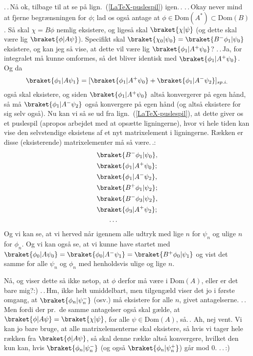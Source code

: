 \documentclass{report}
\begin{document}
.\,.\,Nå ok, tilbage til at se på lign.\ (\ref{LaTeX-puslespil}) igen.\,. .\,.\,Okay never mind at fjerne begrænsningen for $\phi$; lad os også antage at $\phi\in\mathrm{Dom}(A^*)\subset \mathrm{Dom}(B)$. Så skal $\chi = B \phi$ nemlig eksistere, og ligeså skal $\braket{\chi|\psi}$ (og dette skal være lig $\braket{\phi|A \psi}$). Specifikt skal $\braket{\chi_0|\psi_0} = \braket{B^-\phi_1|\psi_0}$ eksistere, og kan jeg så vise, at dette vil være lig $\braket{\phi_1| A^+ \psi_0}$? .\,.\,Ja, for integralet må kunne omformes, så det bliver identisk med $\braket{\phi_1| A^+ \psi_0}$. Og da 
\begin{align}
\begin{aligned}
	\braket{\phi_1|A \psi_1} = 
		[
			\braket{\phi_1 | A^+ \psi_0} +
			\braket{\phi_1 | A^- \psi_2}
		]_{sp.i.}
\end{aligned}
\end{align}
også skal eksistere, og siden $\braket{\phi_1 | A^+ \psi_0}$ altså konvergerer på egen hånd, så må $\braket{\phi_1 | A^- \psi_2}$ også konvergere på egen hånd (og altså eksistere for sig selv også). 
Nu kan vi så se ud fra lign.\ (\ref{LaTeX-puslespil}), at dette giver os et puslespil (apropos arbejdet med at opsætte ligningerne), hvor vi hele tiden kan vise den selvstendige eksistens af et nyt matrixelement i ligningerne. Rækken er disse (eksisterende) matrixelementer må så være.\,.:
\begin{align}
\begin{aligned}
	&\braket{B^- \phi_1 | \psi_0}, \\
	&\braket{\phi_1 | A^+ \psi_0}; \\
	&\braket{\phi_1 | A^- \psi_2}, \\
	&\braket{B^+ \phi_1 | \psi_2}; \\
	&\braket{B^- \phi_3 | \psi_2}, \\
	&\braket{\phi_3 | A^+ \psi_2}; \\
	&\quad\:\:\:\ldots
\end{aligned}
\end{align}
Og vi kan se, at vi herved når igennem alle udtryk med lige $n$ for $\psi_n$ og ulige $n$ for $\phi_n$. Og vi kan også se, at vi kunne have startet med $\braket{\phi_0 | A \psi_0} = \braket{\phi_0 | A^- \psi_1} = \braket{B^+ \phi_0 | \psi_1}$ og vist det samme for alle $\psi_n$ og $\phi_n$ med henholdsvis ulige og lige $n$.

Nå, og viser dette så ikke netop, at $\phi$ derfor må være i Dom$(A)$, eller er det bare mig?:) .\,.\,Hm, ikke helt umiddelbart, men tilgengæld viser det jo i første omgang, at $\braket{\phi_n | \psi_n^-}$ (osv.) må eksistere for alle $n$, givet antagelserne. .\,.\,Men fordi der pr.\ de samme antagelser også skal gælde, at $\braket{\phi|A\psi} = \braket{\chi | \psi}$, for alle $\psi\in\mathrm{Dom}(A)$, så.\,. Ah, nej vent. Vi kan jo bare bruge, at alle matrixelementerne skal eksistere, så hvis vi tager hele rækken fra $\braket{\phi|A\psi}$, så skal denne række altså konvergere, hvilket den kun kan, hvis $\braket{\phi_n | \psi_n^-}$ (og også $\braket{\phi_n | \psi_n^+}$) går mod 0. .\,.\,:) 
\end{document}
